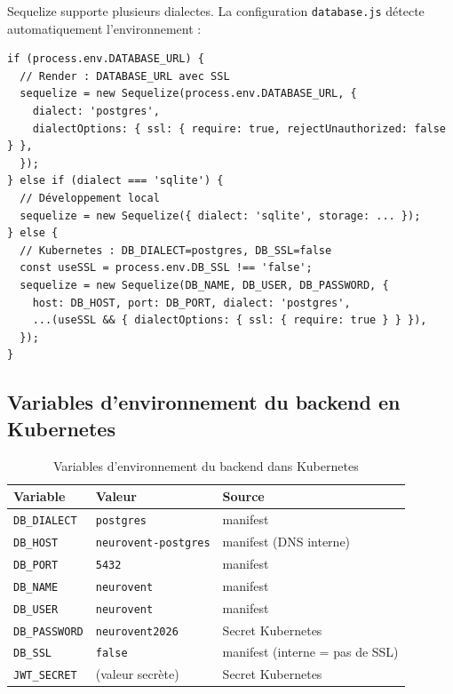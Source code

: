 \documentclass[12pt,a4paper]{article}
\begin{document}
Sequelize supporte plusieurs dialectes. La configuration \texttt{database.js} détecte
automatiquement l'environnement :

\begin{lstlisting}[style=javascript, caption={backend-node/src/config/database.js}]
if (process.env.DATABASE_URL) {
  // Render : DATABASE_URL avec SSL
  sequelize = new Sequelize(process.env.DATABASE_URL, {
    dialect: 'postgres',
    dialectOptions: { ssl: { require: true, rejectUnauthorized: false } },
  });
} else if (dialect === 'sqlite') {
  // Développement local
  sequelize = new Sequelize({ dialect: 'sqlite', storage: ... });
} else {
  // Kubernetes : DB_DIALECT=postgres, DB_SSL=false
  const useSSL = process.env.DB_SSL !== 'false';
  sequelize = new Sequelize(DB_NAME, DB_USER, DB_PASSWORD, {
    host: DB_HOST, port: DB_PORT, dialect: 'postgres',
    ...(useSSL && { dialectOptions: { ssl: { require: true } } }),
  });
}
\end{lstlisting}

\subsection{Variables d'environnement du backend en Kubernetes}

\begin{table}[H]
  \centering
  \begin{tabularx}{\textwidth}{llX}
    \toprule
    \textbf{Variable} & \textbf{Valeur} & \textbf{Source} \\
    \midrule
    \texttt{DB\_DIALECT}  & \texttt{postgres}           & manifest \\
    \texttt{DB\_HOST}     & \texttt{neurovent-postgres} & manifest (DNS interne) \\
    \texttt{DB\_PORT}     & \texttt{5432}               & manifest \\
    \texttt{DB\_NAME}     & \texttt{neurovent}          & manifest \\
    \texttt{DB\_USER}     & \texttt{neurovent}          & manifest \\
    \texttt{DB\_PASSWORD} & \texttt{neurovent2026}      & Secret Kubernetes \\
    \texttt{DB\_SSL}      & \texttt{false}              & manifest (interne = pas de SSL) \\
    \texttt{JWT\_SECRET}  & (valeur secrète)            & Secret Kubernetes \\
    \bottomrule
  \end{tabularx}
  \caption{Variables d'environnement du backend dans Kubernetes}
\end{table}
\end{document}
